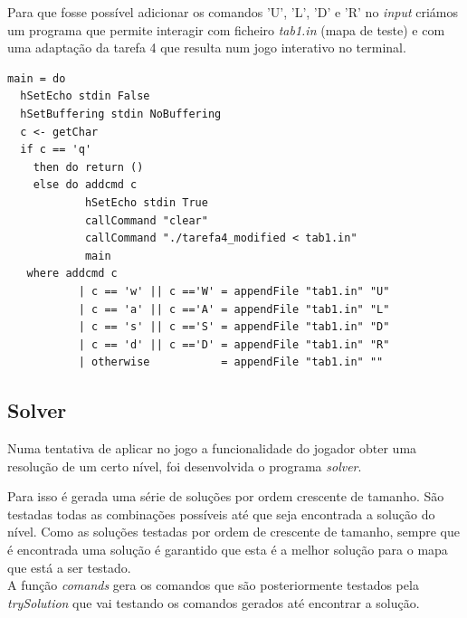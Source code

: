 \documentclass[12pt,a4paper]{report}
\begin{document}
\hfill

Para que fosse possível adicionar os comandos 'U', 'L', 'D' e 'R' no \emph{input} criámos um programa que permite interagir com ficheiro \emph{tab1.in} (mapa de teste) e com uma adaptação da tarefa 4 que resulta num jogo interativo no terminal.

\hfill

\begin{verbatim}
main = do
  hSetEcho stdin False
  hSetBuffering stdin NoBuffering
  c <- getChar
  if c == 'q'
    then do return ()
    else do addcmd c
            hSetEcho stdin True
            callCommand "clear"
            callCommand "./tarefa4_modified < tab1.in"
            main
   where addcmd c
           | c == 'w' || c =='W' = appendFile "tab1.in" "U"
           | c == 'a' || c =='A' = appendFile "tab1.in" "L"
           | c == 's' || c =='S' = appendFile "tab1.in" "D"
           | c == 'd' || c =='D' = appendFile "tab1.in" "R"
           | otherwise           = appendFile "tab1.in" ""
\end{verbatim}

\subsection{Solver}

Numa tentativa de aplicar no jogo a funcionalidade do jogador obter uma resolução de um certo nível, foi desenvolvida o programa \emph{solver}.

Para isso é gerada uma série de soluções por ordem crescente de tamanho. São testadas todas as combinações possíveis até que seja encontrada a solução do nível. Como as soluções testadas por ordem de crescente de tamanho, sempre que é encontrada uma solução é garantido que esta é a melhor solução para o mapa que está a ser testado.\\

A função \emph{comands} gera os comandos que são posteriormente testados pela \emph{trySolution} que vai testando os comandos gerados até encontrar a solução.
\end{document}
